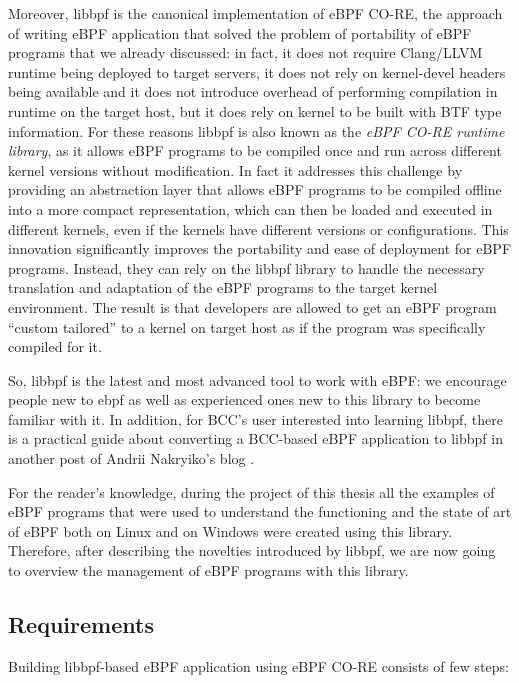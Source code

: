 Moreover, libbpf is the canonical implementation of eBPF CO-RE, the approach of writing eBPF application that solved the problem of portability of eBPF programs that we already discussed: in fact, it does not require Clang/LLVM runtime being deployed to target servers, it does not rely on kernel-devel headers being available and it does not introduce overhead of performing compilation in runtime on the target host, but it does rely on kernel to be built with BTF type information.
For these reasons libbpf is also known as the \textit{eBPF CO-RE runtime library}, as it allows eBPF programs to be compiled once and run across different kernel versions without modification.
In fact it addresses this challenge by providing an abstraction layer that allows eBPF programs to be compiled offline into a more compact representation, which can then be loaded and executed in different kernels, even if the kernels have different versions or configurations.
This innovation significantly improves the portability and ease of deployment for eBPF programs.
Instead, they can rely on the libbpf library to handle the necessary translation and adaptation of the eBPF programs to the target kernel environment.
The result is that developers are allowed to get an eBPF program ``custom tailored'' to a kernel on target host as if the program was specifically compiled for it.

So, libbpf is the latest and most advanced tool to work with eBPF: we encourage people new to ebpf as well as experienced ones new to this library to become familiar with it.
In addition, for BCC's user interested into learning libbpf, there is a practical guide about converting a BCC-based eBPF application to libbpf in another post of Andrii Nakryiko's blog \cite{BCCTolibbpfGuide}.

For the reader's knowledge, during the project of this thesis all the examples of eBPF programs that were used to understand the functioning and the state of art of eBPF both on Linux and on Windows were created using this library.
Therefore, after describing the novelties introduced by libbpf, we are now going to overview the management of eBPF programs with this library.

\subsection{Requirements}

Building libbpf-based eBPF application using eBPF CO-RE consists of few steps:

